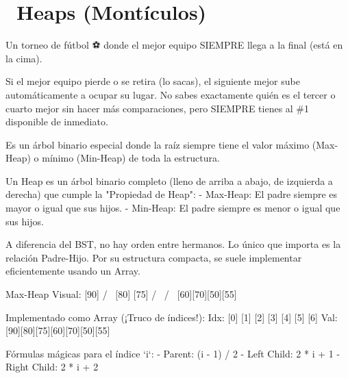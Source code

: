 ﻿\chapter[\emj{🏔️}~Heaps (Montículos)]{~Heaps (Montículos)}

\begin{dsaquees}

Un torneo de fútbol ⚽ donde el mejor equipo SIEMPRE llega a la 
final (está en la cima). 

Si el mejor equipo pierde o se retira (lo sacas), el siguiente mejor
sube automáticamente a ocupar su lugar. No sabes exactamente quién es
el tercer o cuarto mejor sin hacer más comparaciones, pero SIEMPRE 
tienes al \#1 disponible de inmediato.

Es un árbol binario especial donde la raíz siempre tiene el valor 
máximo (Max-Heap) o mínimo (Min-Heap) de toda la estructura.

\end{dsaquees}

\begin{dsaotraforma}

Un Heap es un árbol binario completo (lleno de arriba a abajo, de
izquierda a derecha) que cumple la "Propiedad de Heap":
- Max-Heap: El padre siempre es mayor o igual que sus hijos.
- Min-Heap: El padre siempre es menor o igual que sus hijos.

A diferencia del BST, no hay orden entre hermanos. Lo único que 
importa es la relación Padre-Hijo. Por su estructura compacta, 
se suele implementar eficientemente usando un Array.

\end{dsaotraforma}

\begin{dsadiagrama}
Max-Heap Visual:
          [90]
         /    \
       [80]  [75]
       / \   / \
     [60][70][50][55]

Implementado como Array (¡Truco de índices!):
Idx:  [0] [1] [2] [3] [4] [5] [6]
Val: [90][80][75][60][70][50][55]

Fórmulas mágicas para el índice `i`:
- Parent: (i - 1) / 2
- Left Child: 2 * i + 1
- Right Child: 2 * i + 2
\end{dsadiagrama}


